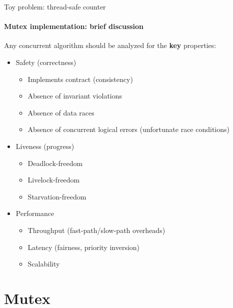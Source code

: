 \begin{frame}{Toy problem: thread-safe counter}
\framesubtitle{Mutex implementation: brief discussion}

Any concurrent algorithm should be analyzed for the \textbf{key} properties:
\begin{itemize}
    \item Safety (correctness)
    \begin{itemize}
        \item Implements contract (consistency)
        \item Absence of invariant violations
        \item Absence of data races
        \item Absence of concurrent logical errors (unfortunate race conditions)
    \end{itemize}
    \item Liveness (progress)
    \begin{itemize}
        \item Deadlock-freedom
        \item Livelock-freedom    
        \item Starvation-freedom
    \end{itemize}
    \item Performance
    \begin{itemize}
        \item Throughput (fast-path/slow-path overheads)
        \item Latency (fairness, priority inversion)
        \item Scalability
    \end{itemize}
\end{itemize}
\end{frame}


\section{Mutex}
